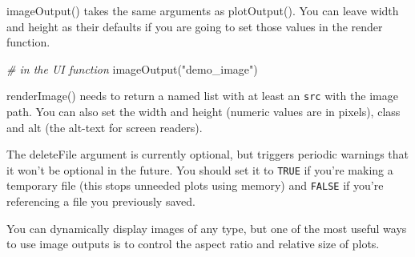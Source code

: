 \documentclass[
]{book}
\newenvironment{Shaded}{\begin{snugshade}}{\end{snugshade}}
\newcommand{\AttributeTok}[1]{\textcolor[rgb]{0.77,0.63,0.00}{#1}}
\newcommand{\CommentTok}[1]{\textcolor[rgb]{0.56,0.35,0.01}{\textit{#1}}}
\newcommand{\ConstantTok}[1]{\textcolor[rgb]{0.00,0.00,0.00}{#1}}
\newcommand{\DecValTok}[1]{\textcolor[rgb]{0.00,0.00,0.81}{#1}}
\newcommand{\FunctionTok}[1]{\textcolor[rgb]{0.00,0.00,0.00}{#1}}
\newcommand{\NormalTok}[1]{#1}
\newcommand{\OtherTok}[1]{\textcolor[rgb]{0.56,0.35,0.01}{#1}}
\newcommand{\SpecialCharTok}[1]{\textcolor[rgb]{0.00,0.00,0.00}{#1}}
\newcommand{\StringTok}[1]{\textcolor[rgb]{0.31,0.60,0.02}{#1}}
\begin{document}
imageOutput() takes the same arguments as plotOutput(). You can leave width and height as their defaults if you are going to set those values in the render function.

\begin{Shaded}
\begin{Highlighting}[]
\CommentTok{\# in the UI function}
\FunctionTok{imageOutput}\NormalTok{(}\StringTok{"demo\_image"}\NormalTok{)}
\end{Highlighting}
\end{Shaded}

renderImage() needs to return a named list with at least an \texttt{src} with the image path. You can also set the width and height (numeric values are in pixels), class and alt (the alt-text for screen readers).

\begin{Shaded}
\end{Shaded}

The deleteFile argument is currently optional, but triggers periodic warnings that it won't be optional in the future. You should set it to \texttt{TRUE} if you're making a temporary file (this stops unneeded plots using memory) and \texttt{FALSE} if you're referencing a file you previously saved.

You can dynamically display images of any type, but one of the most useful ways to use image outputs is to control the aspect ratio and relative size of plots.
\end{document}
